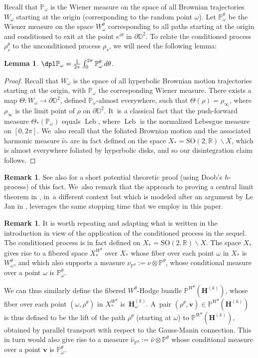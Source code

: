 \documentclass[JEP,XML,SOM,Unicode,published]{cedram}
\DeclareMathOperator{\Leb}{Leb}
\theoremstyle{plain}
\newtheorem{lemma}[thm]{Lemma}
\theoremstyle{definition}
\newtheorem{rem}[thm]{Remark}
\numberwithin{equation}{subsection}
\newcommand\bD{\mathbb{D}}
\newcommand\bP{\mathbb{P}}
\newcommand\bR{\mathbb{R}}\let\R\bR
\newcommand{\SO}{\mathrm{SO}}
\newcommand{\bfH}{\boldsymbol{H}}
\newcommand{\bfv}{\boldsymbol{v}}
\newcommand{\defeq}{:=}
\begin{document}
Recall that $\bP_{\omega}$ is the Wiener measure on the space of all Brownian trajectories~$W_\omega$ starting at the origin (corresponding to the random point $\omega$). Let $\bP^\theta_{\omega}$ be the Wiener measure on the space $W^\theta_\omega$ corresponding to all paths starting at the origin and conditioned to exit at the point $e^{i \theta}$ in $\partial \bD^2$. To relate the conditioned process $\rho_s^\theta$ to the unconditioned process $\rho_s$, we will need the following lemma:
\begin{lemma}\label{disintegration}
$\dpl
\bP_\omega = \frac{1}{2\pi}\int_{0}^{2\pi}\bP^{\theta}_{\omega}\, d\theta$.
\end{lemma}
\begin{proof}
Recall that $W_\omega$ is the space of all hyperbolic Brownian motion trajectories starting at the origin, with $\bP_\omega$ the corresponding Wiener measure. There exists a map $\Theta : W_\omega \to \partial \bD^2$, defined $\bP_\omega$-almost everywhere, such that $\Theta(\rho) = \rho_{\infty}$, where $\rho_\infty$ is the limit point of $\rho$ on $\partial \bD^2$. It~is a classical fact that the push-forward measure $\Theta_{\ast}(\bP_\omega)$ equals $\Leb$, where $\Leb$ is the normalized Lebesgue measure on $[0,2\pi]$. We~also recall that the foliated Brownian motion and the associated harmonic measure $\hat{\nu}_*$ are in fact defined on the space $X_*=\SO(2,\bR)\backslash X$, which is almost everywhere foliated by hyperbolic disks, and so our disintegration claim follows.
\end{proof}
\begin{rem}
See also \cite[Lem.\,8]{Fran05} for a short potential theoretic proof (using Doob's $h$-process) of this fact. We~also remark that the approach to proving a central limit theorem in \cite{Fran05}, in~a different context but which is modeled after an argument by Le Jan in \cite{L94}, leverages the same stopping time that we employ in this paper.
\end{rem}

\begin{rem}
It is worth repeating and adapting what is written in the introduction in view of the application of the conditioned process in the sequel. The conditioned process is in fact defined on $X_* = \SO(2,\bR)\backslash X$. The space $X_*$ gives rise to a fibered space $X^{W^\theta}_*$ over $X_*$ whose fiber over each point $\omega$ in $X_*$ is $W^\theta_\omega$, and which also supports a measure $\nu_{\bP^\theta}\defeq\nu\otimes \bP^\theta$, whose conditional measure over a point $\omega$
is $\bP^\theta_\omega$.

We can thus similarly define the fibered $W^\theta$-Hodge bundle $\bP^{W^\theta}(\bfH^{(k)})$, whose fiber over each point $(\omega,\rho^\theta)$ in $X^{W^\theta}_*$ is~$\bfH^{(k)}_\omega$. A~pair $(\rho^\theta,\bfv) \in \bP^{W^\theta}(\bfH^{(k)})$ is thus defined to be the lift of the path $\rho^\theta$ (starting at $\omega$) to $\bP^{W^\theta}(\bfH^{(k)})$, obtained by parallel transport with respect to the Gauss-Manin connection. This in turn would also give rise to a measure $\hat{\nu}_{\bP^\theta}\defeq\hat{\nu}\otimes \bP^\theta$ whose conditional measure over a point $\bfv$ is $\bP^\theta_\omega$.
\end{rem}
\end{document}
